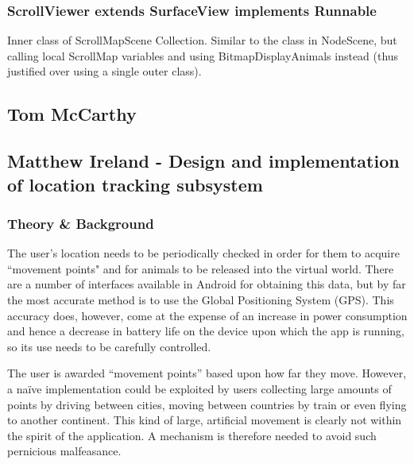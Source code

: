 \documentclass[12pt,a4paper,twoside]{article}
\begin{document}
\subsubsection{ScrollViewer extends SurfaceView implements Runnable}

Inner class of ScrollMapScene Collection. Similar to the class in NodeScene, but calling local ScrollMap variables and using BitmapDisplayAnimals instead (thus justified over using a single outer class).





\subsection{Tom McCarthy}

\newpage
\subsection{Matthew Ireland - Design and implementation of location tracking subsystem}
\subsubsection{Theory \& Background}
The user's location needs to be periodically checked in order for them to acquire ``movement points" and for animals to be released into the virtual world. There are a number of interfaces available in Android for obtaining this data, but by far the most accurate method is to use the Global Positioning System (GPS). This accuracy does, however, come at the expense of an increase in power consumption and hence a decrease in battery life on the device upon which the app is running, so its use needs to be carefully controlled.

The user is awarded ``movement points'' based upon how far they move. However, a na\"{i}ve implementation could be exploited by users collecting large amounts of points by driving between cities, moving between countries by train or even flying to another continent. This kind of large, artificial movement is clearly not within the spirit of the application. A mechanism is therefore needed to avoid such pernicious malfeasance.
\end{document}
